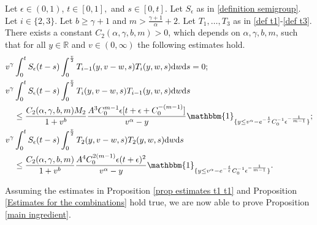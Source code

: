 \documentclass[11pt]{article}
\numberwithin{equation}{section}
\newcommand{\der}{\textup{d}}
\begin{document}
\begin{prop}\label{Estimates for the combinations}Let $\epsilon\in(0,1)$, $t\in[0,1],$ and $s\in[0,t]$. Let $S_{\epsilon}$ as in \eqref{definition semigroup}. Let $i\in\{2,3\}$. Let $b\geq\gamma+1$ and $m>\frac{\gamma+1}{\alpha}+2$. Let $T_{1},\ldots,T_{3}$ as in \eqref{def t1}-\eqref{def t3}. There exists a constant $C_{2}(\alpha,\gamma,b,m)>0$, which depends on $\alpha,\gamma,b,m$, such that  for all $y\in\mathbb{R}$ and $v\in(0,\infty)$ the following estimates hold.
\begin{align}
      v^{\gamma} &\int_{0}^{t}S_{\epsilon}(t-s)\int_{0}^{\frac{v}{2}} T_{i-1}(y,v-w,s)T_{i}(y,w,s)\der w\der s   =0; \label{estimate for t1 t2}\\
   v^{\gamma} &\int_{0}^{t}S_{\epsilon}(t-s)\int_{0}^{\frac{v}{2}} T_{i}(y,v-w,s)T_{i-1}(y,w,s)\der w\der s  \nonumber\\
   &   \leq \frac{C_{2}(\alpha,\gamma,b,m)M_{2}}{1+v^{b}}\frac{A^{3}C_{0}^{m-1} \epsilon[t+\epsilon+C_{0}^{-(m-1)}] }{v^{\alpha}-y}\mathbbm{1}_{\{y\leq v^{\alpha}-e^{-\frac{t}{\epsilon}}C^{-1}_{0}\epsilon^{-\frac{1}{m-1}}\}};\label{estimate for t2 t1}\\
   v^{\gamma} &\int_{0}^{t}S_{\epsilon}(t-s)\int_{0}^{\frac{v}{2}}T_{2}(y,v-w,s)T_{2}(y,w,s)\der w\der s \nonumber\\
   &\leq \frac{C_{2}(\alpha,\gamma,b,m)}{1+v^{b}}\frac{A^{4}C_{0}^{2(m-1)} \epsilon (t+\epsilon)^{2} }{v^{\alpha}-y}\mathbbm{1}_{\{y\leq v^{\alpha}-e^{-\frac{t}{\epsilon}}C^{-1}_{0}\epsilon^{-\frac{1}{m-1}}\}}.\label{estimate for t2 t2}
\end{align}
\end{prop}
Assuming the estimates in Proposition \ref{prop estimates t1 t1} and Proposition \ref{Estimates for the combinations} hold true, we are now able to prove Proposition \ref{main ingredient}. 
\end{document}
